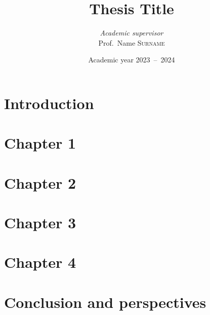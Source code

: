 \documentclass[twoside, 12pt]{extreport}
\institute{University of Liège}
\title{Thesis Title}
\author{\textit{Academic supervisor}\\Prof.\ Name \textsc{Surname}}
\date{Academic year 2023\ --\ 2024}
\begin{document}
    \maketitle
    \chapter*{Introduction}\label{chap:intro}
    

     \chapter{Chapter 1}\label{chap:1-sota}
    

    \chapter{Chapter 2}\label{chap:2-methodology}
    

    \chapter{Chapter 3}\label{chap:3-results}
    

    \chapter{Chapter 4}\label{chap:4-substrate}
    

    \chapter*{Conclusion and perspectives}\label{chap:concl}
    

    
    \newpage
    \appendix
    
    
    \newpage
    \nocite{*}
    \printbibliography
\end{document}
